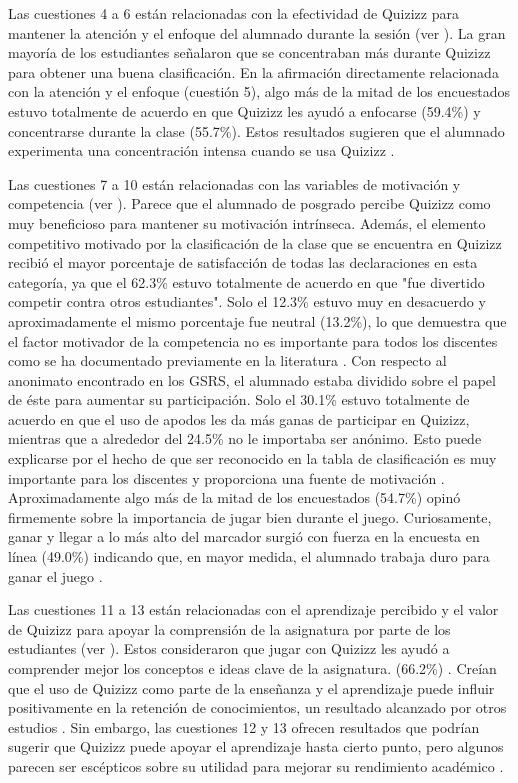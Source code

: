 \documentclass[spanish]{textolivre}
\begin{document}
Las cuestiones 4 a 6 están relacionadas con la efectividad de Quizizz para mantener la atención y el enfoque del alumnado durante la sesión (ver ). La gran mayoría de los estudiantes señalaron que se concentraban más durante Quizizz para obtener una buena clasificación. En la afirmación directamente relacionada con la atención y el enfoque (cuestión 5), algo más de la mitad de los encuestados estuvo totalmente de acuerdo en que Quizizz les ayudó a enfocarse (59.4\%) y concentrarse durante la clase (55.7\%). Estos resultados sugieren que el alumnado experimenta una concentración intensa cuando se usa Quizizz \cite{yunus2021}.

Las cuestiones 7 a 10 están relacionadas con las variables de motivación y competencia (ver ). Parece que el alumnado de posgrado percibe Quizizz como muy beneficioso para mantener su motivación intrínseca. Además, el elemento competitivo motivado por la clasificación de la clase que se encuentra en Quizizz recibió el mayor porcentaje de satisfacción de todas las declaraciones en esta categoría, ya que el 62.3\% estuvo totalmente de acuerdo en que "fue divertido competir contra otros estudiantes". Solo el 12.3\% estuvo muy en desacuerdo y aproximadamente el mismo porcentaje fue neutral (13.2\%), lo que demuestra que el factor motivador de la competencia no es importante para todos los discentes como se ha documentado previamente en la literatura \cite{ryan2000}. Con respecto al anonimato encontrado en los GSRS, el alumnado estaba dividido sobre el papel de éste para aumentar su participación. Solo el 30.1\% estuvo totalmente de acuerdo en que el uso de apodos les da más ganas de participar en Quizizz, mientras que a alrededor del 24.5\% no le importaba ser anónimo. Esto puede explicarse por el hecho de que ser reconocido en la tabla de clasificación es muy importante para los discentes y proporciona una fuente de motivación \cite{dominguez2013, malone1987}. Aproximadamente algo más de la mitad de los encuestados (54.7\%) opinó firmemente sobre la importancia de jugar bien durante el juego. Curiosamente, ganar y llegar a lo más alto del marcador surgió con fuerza en la encuesta en línea (49.0\%) indicando que, en mayor medida, el alumnado trabaja duro para ganar el juego \cite{grinias2017, iaremenko2017}.

Las cuestiones 11 a 13 están relacionadas con el aprendizaje percibido y el valor de Quizizz para apoyar la comprensión de la asignatura por parte de los estudiantes (ver ). Estos consideraron que jugar con Quizizz les ayudó a comprender mejor los conceptos e ideas clave de la asignatura. (66.2\%) \cite{wolff2016}. Creían que el uso de Quizizz como parte de la enseñanza y el aprendizaje puede influir positivamente en la retención de conocimientos, un resultado alcanzado por otros estudios \cite{balta2018, dakka2015, dervan2014}. Sin embargo, las cuestiones 12 y 13 ofrecen resultados que podrían sugerir que Quizizz puede apoyar el aprendizaje hasta cierto punto, pero algunos parecen ser escépticos sobre su utilidad para mejorar su rendimiento académico \cite{mendez2013}.
\end{document}
